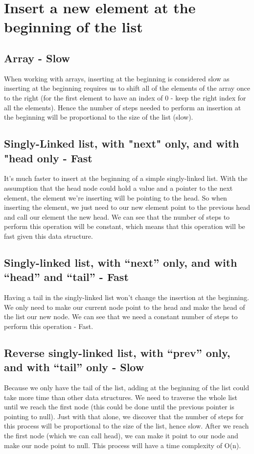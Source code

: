 \documentclass{article}
\begin{document}

\section{Insert a new element at the beginning of the list}


\subsection{Array - Slow}
When working with arrays, inserting at the beginning is considered slow as inserting at the beginning requires us to shift all of the elements of the array once to the right (for the first element to have an index of 0 - keep the right index for all the elements). Hence the number of steps needed to perform an insertion at the beginning will be proportional to the size of the list (slow).

\subsection{Singly-Linked list, with "next" only, and with "head only - Fast}
It's much faster to insert at the beginning of a simple singly-linked list. With the assumption that the head node could hold a value and a pointer to the next element, the element we're inserting will be pointing to the head. So when inserting the element, we just need to our new element point to the previous head and call our element the new head. We can see that the number of steps to perform this operation will be constant, which means that this operation will be fast given this data structure. 

\subsection{Singly-linked list, with “next” only, and with “head” and “tail” - Fast}
Having a tail in the singly-linked list won't change the insertion at the beginning. We only need to make our current node point to the head and make the head of the list our new node. We can see that we need a constant number of steps to perform this operation - Fast.

\subsection{Reverse singly-linked list, with “prev” only, and with “tail” only - Slow}
Because we only have the tail of the list, adding at the beginning of the list could take more time than other data structures. We need to traverse the whole list until we reach the first node (this could be done until the previous pointer is pointing to null). Just with that alone, we discover that the number of steps for this process will be proportional to the size of the list, hence slow. After we reach the first node (which we can call head), we can make it point to our node and make our node point to null. This process will have a time complexity of O(n).  
\end{document}
